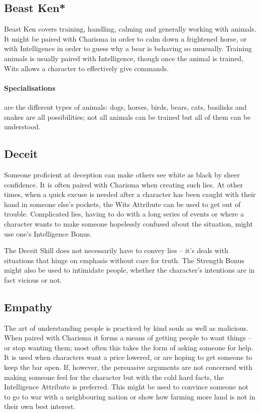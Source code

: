 \begin{multicols}{2}
\subsection{Beast Ken*}

Beast Ken covers training, handling, calming and generally working with animals. It might be paired with Charisma in order to calm down a frightened horse, or with Intelligence in order to guess why a bear is behaving so unusually. Training animals is usually paired with Intelligence, though once the animal is trained, Wits allows a character to effectively give commands.

\paragraph{Specialisations} are the different types of animals: dogs, horses, birds, bears, cats, basilisks and snakes are all possibilities; not all animals can be trained but all of them can be understood.

\subsection{Deceit}

Someone proficient at deception can make others see white as black by sheer confidence. It is often paired with Charisma when creating such lies. At other times, when a quick excuse is needed after a character has been caught with their hand in someone else's pockets, the Wits Attribute can be used to get out of trouble. Complicated lies, having to do with a long series of events or where a character wants to make someone hopelessly confused about the situation, might use one's Intelligence Bonus.

The Deceit Skill does not necessarily have to convey lies -- it's deals with situations that hinge on emphasis without care for truth.
The Strength Bonus might also be used to intimidate people, whether the character's intentions are in fact vicious or not.

\subsection{Empathy}

The art of understanding people is practiced by kind souls as well as malicious. When paired with Charisma it forms a means of getting people to want things -- or stop wanting them; most often this takes the form of asking someone for help. It is used when characters want a price lowered, or are hoping to get someone to keep the bar open. If, however, the persuasive arguments are not concerned with making someone feel for the character but with the cold hard facts, the Intelligence Attribute is preferred. This might be used to convince someone not to go to war with a neighbouring nation or show how farming more land is not in their own best interest.


\end{multicols}
